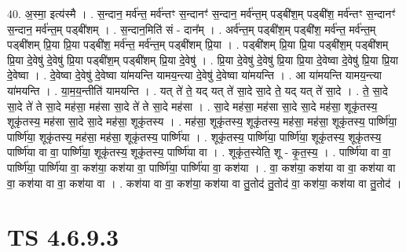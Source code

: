 \documentclass[17pt]{extarticle}
\begin{document}
40. अ॒स्मा॒ इत्य॑स्मै । . स॒न्दान॒ मर्व॑न्त॒ मर्व॑न्तꣳ स॒न्दानꣳ॑ स॒न्दान॒ मर्व॑न्त॒म् पड्बी॑श॒म् पड्बी॑श॒ मर्व॑न्तꣳ स॒न्दानꣳ॑ स॒न्दान॒ मर्व॑न्त॒म् पड्बी॑शम् । . स॒न्दान॒मिति॑ सं - दान᳚म् । . अर्व॑न्त॒म् पड्बी॑श॒म् पड्बी॑श॒ मर्व॑न्त॒ मर्व॑न्त॒म् पड्बी॑शम् प्रि॒या प्रि॒या पड्बी॑श॒ मर्व॑न्त॒ मर्व॑न्त॒म् पड्बी॑शम् प्रि॒या । . पड्बी॑शम् प्रि॒या प्रि॒या पड्बी॑श॒म् पड्बी॑शम् प्रि॒या दे॒वेषु॑ दे॒वेषु॑ प्रि॒या पड्बी॑श॒म् पड्बी॑शम् प्रि॒या दे॒वेषु॑ । . प्रि॒या दे॒वेषु॑ दे॒वेषु॑ प्रि॒या प्रि॒या दे॒वेष्वा दे॒वेषु॑ प्रि॒या प्रि॒या दे॒वेष्वा । . दे॒वेष्वा दे॒वेषु॑ दे॒वेष्वा या॑मयन्ति यामय॒न्त्या दे॒वेषु॑ दे॒वेष्वा या॑मयन्ति । . आ या॑मयन्ति यामय॒न्त्या या॑मयन्ति । . या॒म॒य॒न्तीति॑ यामयन्ति । . यत् ते॑ ते॒ यद् यत् ते॑ सा॒दे सा॒दे ते॒ यद् यत् ते॑ सा॒दे । . ते॒ सा॒दे सा॒दे ते॑ ते सा॒दे मह॑सा॒ मह॑सा सा॒दे ते॑ ते सा॒दे मह॑सा । . सा॒दे मह॑सा॒ मह॑सा सा॒दे सा॒दे मह॑सा॒ शूकृ॑तस्य॒ शूकृ॑तस्य॒ मह॑सा सा॒दे सा॒दे मह॑सा॒ शूकृ॑तस्य । . मह॑सा॒ शूकृ॑तस्य॒ शूकृ॑तस्य॒ मह॑सा॒ मह॑सा॒ शूकृ॑तस्य॒ पार्ष्णि॑या॒ पार्ष्णि॑या॒ शूकृ॑तस्य॒ मह॑सा॒ मह॑सा॒ शूकृ॑तस्य॒ पार्ष्णि॑या । . शूकृ॑तस्य॒ पार्ष्णि॑या॒ पार्ष्णि॑या॒ शूकृ॑तस्य॒ शूकृ॑तस्य॒ पार्ष्णि॑या वा वा॒ पार्ष्णि॑या॒ शूकृ॑तस्य॒ शूकृ॑तस्य॒ पार्ष्णि॑या वा । . शूकृ॑त॒स्येति॒ शू - कृ॒त॒स्य॒ । . पार्ष्णि॑या वा वा॒ पार्ष्णि॑या॒ पार्ष्णि॑या वा॒ कश॑या॒ कश॑या वा॒ पार्ष्णि॑या॒ पार्ष्णि॑या वा॒ कश॑या । . वा॒ कश॑या॒ कश॑या वा वा॒ कश॑या वा वा॒ कश॑या वा वा॒ कश॑या वा । . कश॑या वा वा॒ कश॑या॒ कश॑या वा तु॒तोद॑ तु॒तोद॑ वा॒ कश॑या॒ कश॑या वा तु॒तोद॑ । \newline
\pagebreak
{}

\section{ TS 4.6.9.3 }
\end{document}
